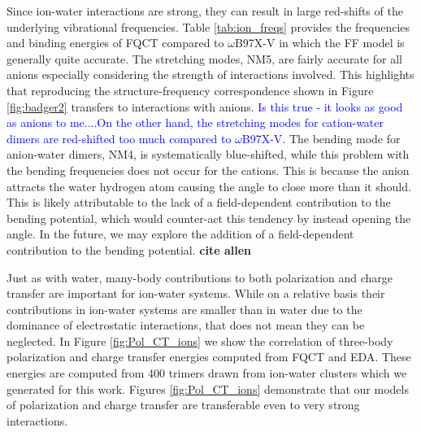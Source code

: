 \documentclass[journal=jctcce,manuscript=article]{achemso}
\begin{document}
Since ion-water interactions are strong, they can result in large red-shifts of the underlying vibrational frequencies. Table \ref{tab:ion_freqs} provides the frequencies and binding energies of FQCT compared to $\omega$B97X-V in which the FF model is generally quite accurate. The  stretching modes, NM5, are fairly accurate for all anions especially considering the strength of interactions involved. This highlights that reproducing the structure-frequency correspondence shown in Figure \ref{fig:badger2} transfers to interactions with anions. \textcolor{blue}{Is this true - it looks as good as anions to me....On the other hand, the  stretching modes for cation-water dimers are red-shifted too much compared to $\omega$B97X-V.} The bending mode for anion-water dimers, NM4, is systematically blue-shifted, while this problem with the bending frequencies does not occur for the cations. This is because the anion attracts the water hydrogen atom causing the  angle to close more than it should. This is likely attributable to the lack of a field-dependent contribution to the bending potential, which would counter-act this tendency by instead opening the  angle. In the future, we may explore the addition of a field-dependent contribution to the bending potential. \textbf{cite allen} %

Just as with water, many-body contributions to both polarization and charge transfer are important for ion-water systems. While on a relative basis their contributions in ion-water systems are smaller than in water due to the dominance of electrostatic interactions, that does not mean they can be neglected. In Figure \ref{fig:Pol_CT_ions} we show the correlation of three-body polarization and charge transfer energies computed from FQCT and EDA. These energies are computed from 400 trimers drawn from ion-water clusters which we generated for this work. Figures \ref{fig:Pol_CT_ions} demonstrate that our models of polarization and charge transfer are transferable even to very strong interactions. 
\end{document}

